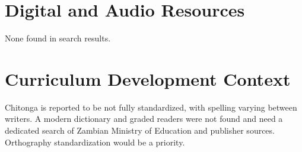 \documentclass[12pt]{article}
\begin{document}
\section{Digital and Audio Resources}
None found in search results.

\section{Curriculum Development Context}
Chitonga is reported to be not fully standardized, with spelling varying between writers. A modern dictionary and graded readers were not found and need a dedicated search of Zambian Ministry of Education and publisher sources. Orthography standardization would be a priority.
\end{document}
